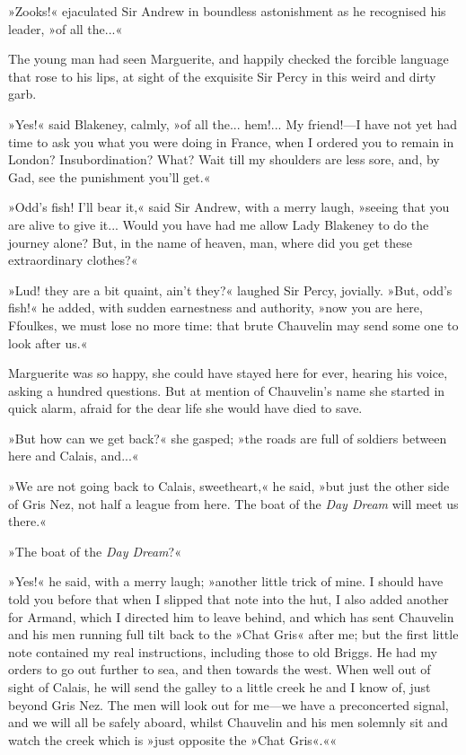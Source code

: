 »Zooks!« ejaculated Sir Andrew in boundless astonishment as he recognised his leader, »of all the...«

The young man had seen Marguerite, and happily checked the forcible language that rose to his lips, at sight of the exquisite Sir Percy in this weird and dirty garb.

»Yes!« said Blakeney, calmly, »of all the... hem!... My friend!\allowbreak---\allowbreak I have not yet had time to ask you what you were doing in France, when I ordered you to remain in London? Insubordination? What? Wait till my shoulders are less sore, and, by Gad, see the punishment you'll get.«

»Odd's fish! I'll bear it,« said Sir Andrew, with a merry laugh, »seeing that you are alive to give it... Would you have had me allow Lady Blakeney to do the journey alone? But, in the name of heaven, man, where did you get these extraordinary clothes?«

»Lud! they are a bit quaint, ain't they?« laughed Sir Percy, jovially. »But, odd's fish!« he added, with sudden earnestness and authority, »now you are here, Ffoulkes, we must lose no more time: that brute Chauvelin may send some one to look after us.«

Marguerite was so happy, she could have stayed here for ever, hearing his voice, asking a hundred questions. But at mention of Chauvelin's name she started in quick alarm, afraid for the dear life she would have died to save.

»But how can we get back?« she gasped; »the roads are full of soldiers between here and Calais, and...«

»We are not going back to Calais, sweetheart,« he said, »but just the other side of Gris Nez, not half a league from here. The boat of the \textit{Day Dream} will meet us there.«

»The boat of the \textit{Day Dream}?«

»Yes!« he said, with a merry laugh; »another little trick of mine. I should have told you before that when I slipped that note into the hut, I also added another for Armand, which I directed him to leave behind, and which has sent Chauvelin and his men running full tilt back to the »Chat Gris« after me; but the first little note contained my real instructions, including those to old Briggs. He had my orders to go out further to sea, and then towards the west. When well out of sight of Calais, he will send the galley to a little creek he and I know of, just beyond Gris Nez. The men will look out for me\allowbreak---\allowbreak we have a preconcerted signal, and we will all be safely aboard, whilst Chauvelin and his men solemnly sit and watch the creek which is »just opposite the »Chat Gris«.««

